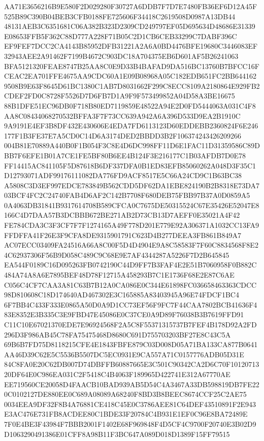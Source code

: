 \documentclass[UTF8,fontset=fandol,zihao=-4,a4paper]{ctexart}
\begin{document}
{{AA71E3656216B9E580F2D029280F30727A6DDB7F7D7E7480FB36EF6D12A45F525B89C390B04BEB3CFB0188FE725606F34418C2619508D0987A13DB44
48131AEB3C6351681C06A382B323D2309CD249797EF05D695634D48686E31339E08653FFB5F362C88D777A228F71B05C2D1CB6CEB33299C7DABF396C
EF9FEF7DCC2CA4143B85952DFB31221A2A6A0BD4476BFE19680C3446083EF32943AEE2A91462F7199B4672C903DC18A704375EB6D601AF5B26241063
BFA5121320FEAE8747B25AA8C0E9D33B4BAFAD9DA516BC13760B7BFCC16FCEAC2EA701FFE4675AA9CDC60A1E09B08968A05C182EDB651FC2BB644162
9508B9E63F8645D61BC1380C1AB7D8031662F299C8ECC8109A2180864E929FB2CDEF2FD0C8728F5526D7D6FB7D1A9F9F573499852A04D58A3BE16675
88B1DFE51EC96DB0F718B80ED7119859E48522A94E2D0FD5444063A031C4F8AA8C08434068270532BFFA3F7F73CC639A942A6A396D533D9EA2B1910C
9A9191E4EF3B8DF432E430606E4EDA7FD6113123D60EDDEBB2360824F6E246177F1B3FE37E7A5CD0C14D6A3174DED2BBDD3B2F106374243426209266
004B81E70889A440B0F1B054F3C8E4D6DC998FF11D6E1FAC11D31359586C89DBB7F6EFE1B01A7CE1FE5BF80B6EE4B124F3E216177C1B03AFDB7D0E78
FF14415AC841105F5D87618B6DF337DFA0B1ED83EFB85060262A048D3F35C1D12793071ADF99176111082DA776FD9ACF8517E5C66A24CD9C1B63BC38
A5808C3D3EF997EDCE783849B562CDD5DF62DA1EBE824190B2B8318E73DA703BCF4FC2C24740FAB4D6AF2C142B7708F680DEB75FBB97B37A0D0859A5
0A4063DB31841B9317614708B589CFCA0C7675DE50315524C67E35426E52047E8166C4D7DAA57B3DCBBB672BE271AB2D73CB13D7AEFF0E35021A4F42
FE784CDA3C3F3CF7F7F1274165A49F778D201E779E92A306371A1032CC13FA9FFDFFA41F26E3F9CFA8DE9315901791C623D4B277DEEA3FB861B849A7
AC07ECC03409FA24516A66A8C00F5D4D4904E9A8C58583F7F60C8834568F8E24C62937306F56B9D058C489C9C68E9E7AF4344287A5226F7D2B645845
EA544F0189C16D095263FB0742190C44D9FF7B3FAF4E2E51B7060958F0B882C484A74A8A6E7895BEF48D78F12715A458293B7C1E1736F68E2E87C6AE
C056C4CF7CAA3A81C63B7B12A0CA086E0C344E61898FC036658463363CDCC98D810608C18D174640AD467302E3C165885A83403945A96E74FDCF1BC4
6F7BB4C433F333E0865A50D0A9D1CC73EF56F9FC7F44CAA7802BCB41636F483E8352E3B335C3E9FBD47E45086E0C37CE0A9D89F76038B3B7619FFD91
C11C10E67021370EDE7E96924568F2A5C8F55371315737B7FEF4B178D92A2FD296D3F986AB45C78FA75475468D8680C691D755703203BF27E8C43C5A
69B6B7FD75D8118215CFE4E1843FBFE879C03D008D05A71BA133CA877B0641AA46D39C62E5C5536B5507DC5EC0931E9CA557A71C0157776ADB05D31E
84C8FA0E20C62DB007D74DBFFB60887665E3C501C90342CA2D6C70F1012071320DF64E0C986EA031C2F5418C4B4063F189965D422741E312A67770AE
EE719560CE20058D4FAACB10BAD939AB5D54C4A3467A33DB598819DB7FE220C0102127DE880EE0C689A08089A68240F8BD3B8BEEC8674CCF25C2AE75
0034EEA9DF32F8B4A76881CE418C45E0C3786AEE81C64DEF43510891F2E943E3AC476E731FB8ACDEE80C1BDE33F20784C4B931E1EF0C96E8BA72489E
7F0E4BE3F43984F7BBB2001F1402E68F969848F4D5CF4C9700F20740E3B02D9D1063290491386E01CFF8A98B11F3BC647A089D018D1389F15FF79515
}}
\end{document}

